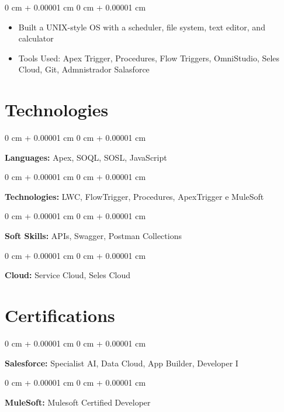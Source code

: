 \documentclass[10pt, letterpaper]{article}
\newenvironment{highlights}{
    \begin{itemize}[
        topsep=0.10 cm,
        parsep=0.10 cm,
        partopsep=0pt,
        itemsep=0pt,
        leftmargin=0 cm + 10pt
    ]
}{
    \end{itemize}
} %
\newenvironment{onecolentry}{
    \begin{adjustwidth}{
        0 cm + 0.00001 cm
    }{
        0 cm + 0.00001 cm
    }
}{
    \end{adjustwidth}
} %
\begin{document}
        \vspace{0.10 cm}
        \begin{onecolentry}
            \begin{highlights}
                \item Built a UNIX-style OS with a scheduler, file system, text editor, and calculator
                \item Tools Used: Apex Trigger, Procedures, Flow Triggers, OmniStudio, Seles Cloud, Git, Admnistrador Salasforce
            \end{highlights}
        \end{onecolentry}
        

        

    
    \section{Technologies}



        
        \begin{onecolentry}
            \textbf{Languages:} Apex, SOQL, SOSL, JavaScript
        \end{onecolentry}

        \vspace{0.2 cm}

        \begin{onecolentry}
            \textbf{Technologies:} LWC, FlowTrigger, Procedures, ApexTrigger e MuleSoft
        \end{onecolentry}

        \vspace{0.2 cm}   

               \begin{onecolentry}
            \textbf{Soft Skills:} APIs, Swagger, Postman Collections 
        \end{onecolentry}

        \vspace{0.2 cm}   
        
        \begin{onecolentry}
            \textbf{Cloud:} Service Cloud, Seles Cloud
        \end{onecolentry}


        \section{Certifications}



        
        \begin{onecolentry}
            \textbf{Salesforce:} Specialist AI, Data Cloud, App Builder, Developer I
        \end{onecolentry}

                \begin{onecolentry}
            \textbf{MuleSoft:} Mulesoft Certified Developer 
        \end{onecolentry}

    

    
\end{document}
